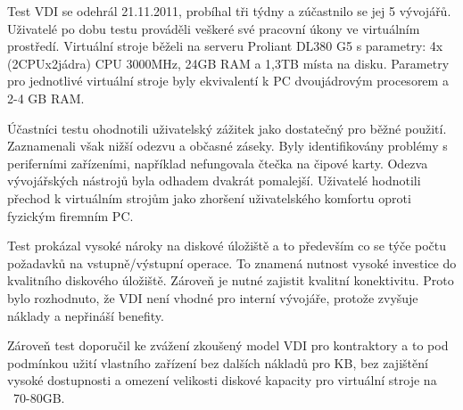 Test VDI se odehrál 21.11.2011, probíhal tři týdny a zúčastnilo se jej 5 vývojářů. Uživatelé po dobu testu prováděli veškeré své pracovní úkony ve virtuálním prostředí. Virtuální stroje běželi na serveru Proliant DL380 G5 s parametry: 4x (2CPUx2jádra) CPU 3000MHz, 24GB RAM a 1,3TB místa na disku. Parametry pro jednotlivé virtuální stroje byly ekvivalentí k PC dvoujádrovým procesorem a 2-4 GB RAM.

Účastníci testu ohodnotili uživatelský zážitek jako dostatečný pro běžné použití. Zaznamenali však nižší odezvu a občasné záseky. Byly identifikovány problémy s periferními zařízeními, například nefungovala čtečka na čipové karty. Odezva vývojářských nástrojů byla odhadem dvakrát pomalejší. Uživatelé hodnotili přechod k virtuálním strojům jako zhoršení uživatelského komfortu oproti fyzickým firemním PC. 

Test prokázal vysoké nároky na diskové úložiště a to především co se týče počtu požadavků na vstupně/výstupní operace. To znamená nutnost vysoké investice do kvalitního diskového úložiště. Zároveň je nutné zajistit kvalitní konektivitu. Proto bylo rozhodnuto, že VDI není vhodné pro interní vývojáře, protože zvyšuje náklady a nepřináší benefity.

Zároveň test doporučil ke zvážení zkoušený model VDI pro kontraktory a to pod podmínkou užití vlastního zařízení bez dalších nákladů pro KB, bez zajištění vysoké dostupnosti a omezení velikosti diskové kapacity pro virtuální stroje na ~70-80GB.





